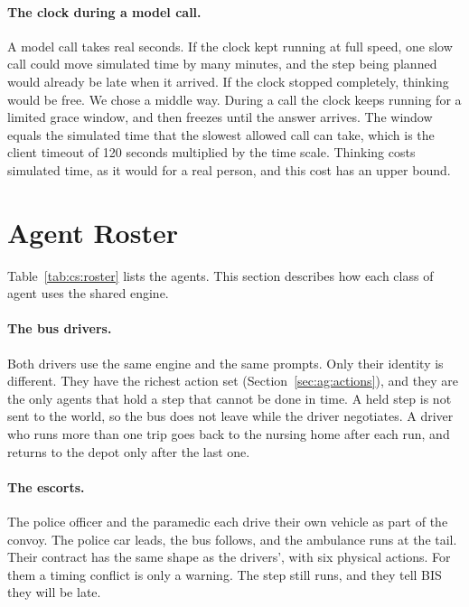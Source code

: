 \paragraph{The clock during a model call.} A model call takes real seconds. If
the clock kept running at full speed, one slow call could move simulated time by
many minutes, and the step being planned would already be late when it arrived.
If the clock stopped completely, thinking would be free. We chose a middle
way. During a call the clock keeps running for a limited grace window, and then
freezes until the answer arrives. The window equals the simulated time that the
slowest allowed call can take, which is the client timeout of 120 seconds
multiplied by the time scale. Thinking costs simulated time, as it would for a
real person, and this cost has an upper bound.

\section{Agent Roster}
\label{sec:ag:roster}

Table~\ref{tab:cs:roster} lists the agents. This section describes how each
class of agent uses the shared engine.

\paragraph{The bus drivers.} Both drivers use the same engine and the same
prompts. Only their identity is different. They have the richest action set
(Section~\ref{sec:ag:actions}), and they are the only agents that hold a step that cannot be
done in time. A held step is not sent to the world, so the bus does not leave
while the driver negotiates. A driver who runs more than one trip goes back to
the nursing home after each run, and returns to the depot only after the last
one.

\paragraph{The escorts.} The police officer and the paramedic each drive their
own vehicle as part of the convoy. The police car leads, the bus follows, and
the ambulance runs at the tail. Their contract has the same
shape as the drivers', with six physical actions. For them a timing conflict is
only a warning. The step still runs, and they tell BIS they will be late.

